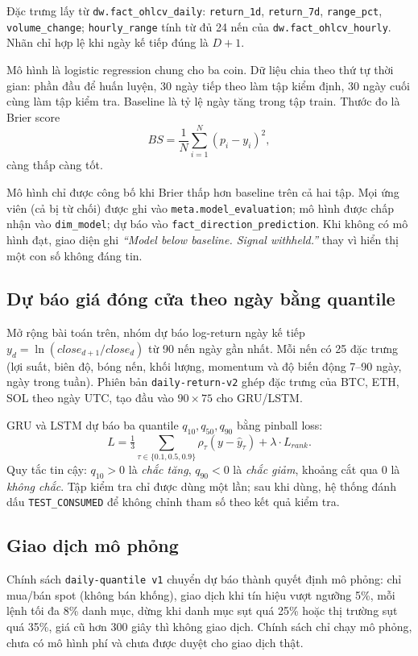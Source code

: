 \documentclass[11pt,a4paper]{article}
\newcommand{\code}[1]{\texttt{#1}}
\begin{document}
Đặc trưng lấy từ \code{dw.fact\_ohlcv\_daily}: \code{return\_1d}, \code{return\_7d},
\code{range\_pct}, \code{volume\_change}; \code{hourly\_range} tính từ đủ 24 nến của
\code{dw.fact\_ohlcv\_hourly}. Nhãn chỉ hợp lệ khi ngày kế tiếp đúng là $D+1$.

Mô hình là logistic regression chung cho ba coin. Dữ liệu chia theo thứ tự thời gian: phần đầu để
huấn luyện, 30 ngày tiếp theo làm tập kiểm định, 30 ngày cuối cùng làm tập kiểm tra. Baseline là tỷ lệ ngày tăng trong tập train.
Thước đo là Brier score
\[ BS = \frac{1}{N}\sum_{i=1}^{N} (p_i - y_i)^2, \]
càng thấp càng tốt.

Mô hình chỉ được công bố khi Brier thấp hơn baseline trên cả hai tập. Mọi
ứng viên (cả bị từ chối) được ghi vào \code{meta.model\_evaluation}; mô hình được chấp nhận vào
\code{dim\_model}; dự báo vào \code{fact\_direction\_prediction}. Khi không có mô hình đạt, giao
diện ghi \emph{``Model below baseline. Signal withheld.''} thay vì hiển thị một con số không đáng tin.

\subsection{Dự báo giá đóng cửa theo ngày bằng quantile}
Mở rộng bài toán trên, nhóm dự báo log-return ngày kế tiếp
$y_d = \ln(close_{d+1}/close_d)$ từ 90 nến ngày gần nhất. Mỗi nến có 25 đặc trưng (lợi suất,
biên độ, bóng nến, khối lượng, momentum và độ biến động 7--90 ngày, ngày trong tuần). Phiên bản
\code{daily-return-v2} ghép đặc trưng của BTC, ETH, SOL theo ngày UTC, tạo đầu vào
$90 \times 75$ cho GRU/LSTM.

GRU và LSTM dự báo ba quantile $q_{10}, q_{50}, q_{90}$ bằng pinball loss:
\[ L = \tfrac{1}{3}\sum_{\tau \in \{0.1, 0.5, 0.9\}} \rho_\tau(y - \hat{y}_\tau)
  + \lambda \cdot L_{rank}. \]
Quy tắc tin cậy: $q_{10} > 0$ là \emph{chắc tăng}, $q_{90} < 0$ là \emph{chắc giảm}, khoảng
cắt qua 0 là \emph{không chắc}. Tập kiểm tra chỉ được dùng một lần; sau khi dùng, hệ thống đánh
dấu \code{TEST\_CONSUMED} để không chỉnh tham số theo kết quả kiểm tra.

\subsection{Giao dịch mô phỏng}
Chính sách \code{daily-quantile v1} chuyển dự báo thành quyết định mô phỏng: chỉ mua/bán spot (không
bán khống), giao dịch khi tín hiệu vượt ngưỡng 5\%, mỗi lệnh tối đa 8\% danh mục, dừng khi danh mục
sụt quá 25\% hoặc thị trường sụt quá 35\%, giá cũ hơn 300 giây thì không giao dịch. Chính sách chỉ
chạy mô phỏng, chưa có mô hình phí và chưa được duyệt cho giao dịch thật.
\end{document}
